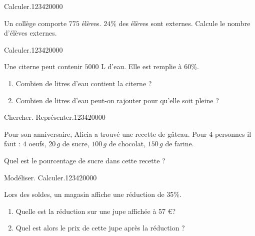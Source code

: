 \begin{pageParcoursd} 

\begin{ExoCd}{Calculer.}{1234}{2}{0}{0}{0}{0}

Un collège comporte $775$ élèves. $24\%$ des élèves sont externes. Calcule le nombre d'élèves externes. 
 
\end{ExoCd}

\begin{ExoCd}{Calculer.}{1234}{2}{0}{0}{0}{0}


Une citerne peut contenir $5000$ L d'eau. Elle est remplie à $60\%$.

\begin{enumerate}[leftmargin=*]
\item Combien de litres d'eau contient la citerne ? 
\item Combien de litres d'eau peut-on rajouter pour qu'elle soit pleine ? 
\end{enumerate}

\end{ExoCd}

\begin{ExoCd}{Chercher. Représenter.}{1234}{2}{0}{0}{0}{0}
 

Pour son anniversaire, Alicia a trouvé une recette de gâteau. Pour 4 personnes il faut : $4$ oeufs, $20\,g$ de sucre, $100\,g$ de chocolat, $150\,g$ de farine.

Quel est le pourcentage de sucre dans cette recette ? 

\end{ExoCd}

\begin{ExoCd}{Modéliser. Calculer.}{1234}{2}{0}{0}{0}{0}
 

Lors des soldes, un magasin affiche une réduction de 35\%. 
\begin{enumerate}[leftmargin=*]
\item Quelle est la réduction sur une jupe affichée à 57 \euro ?
\item Quel est alors le prix de cette jupe après la réduction ?
\end{enumerate}
\end{ExoCd}
 
 
\end{pageParcoursd}
